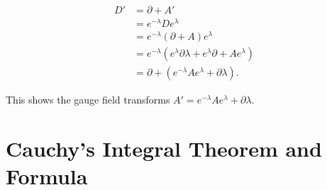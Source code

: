 	\begin{align*}
	D' &= \partial + A' \\
	&= e^{-\lambda}De^{\lambda}\\
	&=e^{-\lambda}\left(\partial + A\right)e^{\lambda} \\
	&= e^{-\lambda}\left(e^{\lambda}\partial\lambda + e^{\lambda}\partial + Ae^{\lambda}\right)\\
	&= \partial + \left(e^{-\lambda}Ae^{\lambda}+\partial\lambda\right).
	\end{align*}
	
	This shows the gauge field transforms $A' = e^{-\lambda}Ae^{\lambda}+\partial\lambda.$
	
	
	\section{Cauchy's Integral Theorem and Formula}